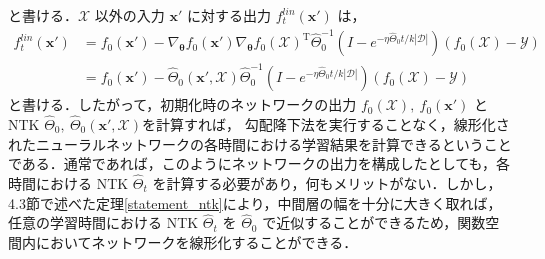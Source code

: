 と書ける．$\mathcal{X}$ 以外の入力 $\bm{x}'$ に対する出力 $f_t^{lin}(\bm{x}')$ は，
\begin{align}
    f_t^{lin}(\bm{x}') &= f_0(\bm{x}') - \nabla_{\bm{\theta}}f_0(\bm{x}')\nabla_{\bm{\theta}}f_0(\mathcal{X})^{\mathrm{T}}\hat{\Theta}_{0}^{-1}\left(I - e^{-\eta\hat{\Theta}_0 t/k|\mathcal{D}|}\right)(f_0(\mathcal{X})- \mathcal{Y}) \\
    &= f_0(\bm{x}') - \hat{\Theta}_0(\bm{x}', \mathcal{X}) \hat{\Theta}_0^{-1}\left(I - e^{-\eta\hat{\Theta}_0 t/k|\mathcal{D}|}\right)(f_0(\mathcal{X})- \mathcal{Y})
\end{align}
と書ける．したがって，初期化時のネットワークの出力 $f_0(\mathcal{X}), \ f_0(\bm{x}')$ とNTK $\hat{\Theta}_0, \ \hat{\Theta}_0(\bm{x}',\mathcal{X})$を計算すれば， 勾配降下法を実行することなく，線形化されたニューラルネットワークの各時間における学習結果を計算できるということである．通常であれば，このようにネットワークの出力を構成したとしても，各時間における NTK $\hat{\Theta}_t$ を計算する必要があり，何もメリットがない．しかし，4.3節で述べた定理\ref{statement_ntk}により，中間層の幅を十分に大きく取れば，任意の学習時間における NTK $\hat{\Theta}_t$ を $\hat{\Theta}_0$ で近似することができるため，関数空間内においてネットワークを線形化することができる．